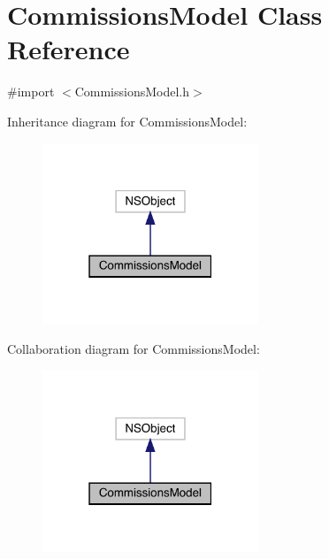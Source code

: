 \hypertarget{interface_commissions_model}{}\section{Commissions\+Model Class Reference}
\label{interface_commissions_model}


{\ttfamily \#import $<$Commissions\+Model.\+h$>$}



Inheritance diagram for Commissions\+Model\+:\nopagebreak
\begin{figure}[H]
\begin{center}
\leavevmode
\includegraphics[width=183pt]{interface_commissions_model__inherit__graph}
\end{center}
\end{figure}


Collaboration diagram for Commissions\+Model\+:\nopagebreak
\begin{figure}[H]
\begin{center}
\leavevmode
\includegraphics[width=183pt]{interface_commissions_model__coll__graph}
\end{center}
\end{figure}
